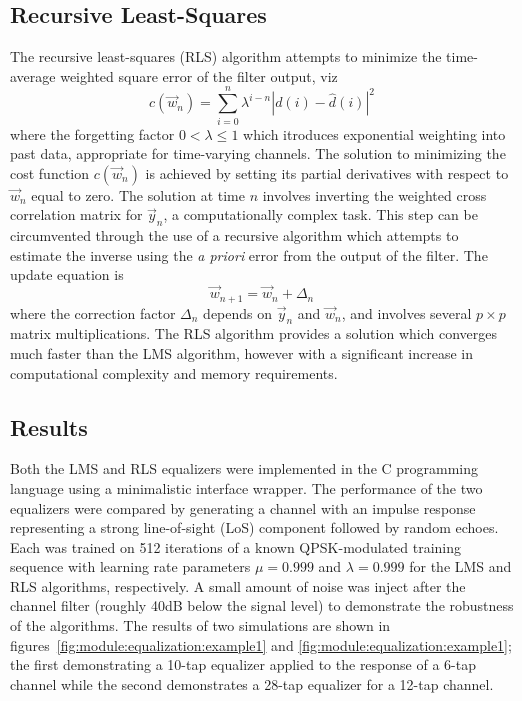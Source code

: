 \subsection{Recursive Least-Squares}
The recursive least-squares (RLS) algorithm attempts to minimize the
time-average weighted square error of the filter output, viz
\begin{equation}
c(\vec{w}_n) = \sum\limits_{i=0}^{n}{ \lambda^{i-n} \left| d(i)-\hat{d}(i)\right|^2 }
\end{equation}
where the forgetting factor $0<\lambda\leq 1$ which itroduces exponential
weighting into past data, appropriate for time-varying channels.
The solution to minimizing the cost function $c(\vec{w}_n)$ is achieved by
setting its partial derivatives with respect to $\vec{w}_n$ equal to zero.
The solution at time $n$ involves inverting the weighted cross correlation
matrix for $\vec{y}_n$, a computationally complex task.
This step can be circumvented through the use of a recursive algorithm which
attempts to estimate the inverse using the {\it a priori} error from the
output of the filter.
The update equation is
\begin{equation}
\label{eq:rls:weight_update}
\vec{w}_{n+1} = \vec{w}_n + \Delta_{n}
\end{equation}
where the correction factor $\Delta_{n}$ depends on $\vec{y}_n$ and $\vec{w}_n$,
and involves several $p \times p$ matrix multiplications.
The RLS algorithm provides a solution which converges much faster than the LMS
algorithm, however with a significant increase in computational complexity and
memory requirements.

\subsection{Results}
Both the LMS and RLS equalizers were implemented in the C programming
language using a minimalistic interface wrapper.
The performance of the two equalizers were compared by generating a channel
with an impulse response representing a strong line-of-sight (LoS) component
followed by random echoes.
Each was trained on 512 iterations of a known QPSK-modulated training sequence with learning
rate parameters $\mu=0.999$ and $\lambda=0.999$ for the LMS and RLS algorithms,
respectively.
A small amount of noise was inject after the channel filter (roughly 40dB
below the signal level) to demonstrate the robustness of the algorithms.
The results of two simulations are shown in
figures~\ref{fig:module:equalization:example1} and
\ref{fig:module:equalization:example1};
the first demonstrating a 10-tap equalizer applied to the response of a 6-tap
channel while the second demonstrates a 28-tap equalizer for a 12-tap
channel.

